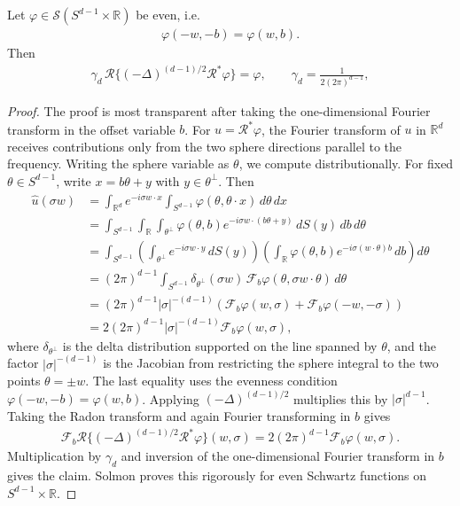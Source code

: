 \begin{theorem}
Let $\varphi\in \mathcal{S}(S^{d-1}\times \mathbb{R})$ be even, i.e.
\begin{align*}
	\varphi(-w,-b)=\varphi(w,b).
\end{align*}
Then
\begin{align*}
	\gamma_d\,\mathcal{R}\{(-\Delta)^{(d-1)/2}\mathcal{R}^*\varphi\}
	= \varphi,
	\qquad
	\gamma_d=\frac{1}{2(2\pi)^{d-1}},
\end{align*}
\end{theorem}
\begin{proof}
The proof is most transparent after taking the one-dimensional Fourier transform in the offset variable $b$. For $u=\mathcal{R}^*\varphi$, the Fourier transform of $u$ in $\mathbb{R}^d$ receives contributions only from the two sphere directions parallel to the frequency. Writing the sphere variable as $\theta$, we compute distributionally. For fixed $\theta\in S^{d-1}$, write $x=b\theta+y$ with $y\in \theta^\perp$. Then
\begin{align*}
	\widehat{u}(\sigma w)
	&= \int_{\mathbb{R}^d} e^{-i\sigma w\cdot x}
		\int_{S^{d-1}}\varphi(\theta,\theta\cdot x)\,d\theta\,dx\\
	&= \int_{S^{d-1}}\int_{\mathbb{R}}\int_{\theta^\perp}
		\varphi(\theta,b)e^{-i\sigma w\cdot(b\theta+y)}\,dS(y)\,db\,d\theta\\
	&= \int_{S^{d-1}}
		\left(\int_{\theta^\perp}e^{-i\sigma w\cdot y}\,dS(y)\right)
		\left(\int_{\mathbb{R}}\varphi(\theta,b)e^{-i\sigma(w\cdot\theta)b}\,db\right)d\theta\\
	&= (2\pi)^{d-1}\int_{S^{d-1}}
		\delta_{\theta^\perp}(\sigma w)\,
		\mathcal{F}_b\varphi(\theta,\sigma w\cdot\theta)\,d\theta\\
	&= (2\pi)^{d-1}|\sigma|^{-(d-1)}
		\left(\mathcal{F}_b\varphi(w,\sigma)+\mathcal{F}_b\varphi(-w,-\sigma)\right)\\
	&=2(2\pi)^{d-1}|\sigma|^{-(d-1)}\mathcal{F}_b\varphi(w,\sigma),
\end{align*}
where $\delta_{\theta^\perp}$ is the delta distribution supported on the line spanned by $\theta$, and the factor $|\sigma|^{-(d-1)}$ is the Jacobian from restricting the sphere integral to the two points $\theta=\pm w$. The last equality uses the evenness condition $\varphi(-w,-b)=\varphi(w,b)$. Applying $(-\Delta)^{(d-1)/2}$ multiplies this by $|\sigma|^{d-1}$. Taking the Radon transform and again Fourier transforming in $b$ gives
\begin{align*}
	\mathcal{F}_b\mathcal{R}\{(-\Delta)^{(d-1)/2}\mathcal{R}^*\varphi\}(w,\sigma)
	=2(2\pi)^{d-1}\mathcal{F}_b\varphi(w,\sigma).
\end{align*}
Multiplication by $\gamma_d$ and inversion of the one-dimensional Fourier transform in $b$ gives the claim. Solmon proves this rigorously for even Schwartz functions on $S^{d-1}\times\mathbb{R}$.
\end{proof}

